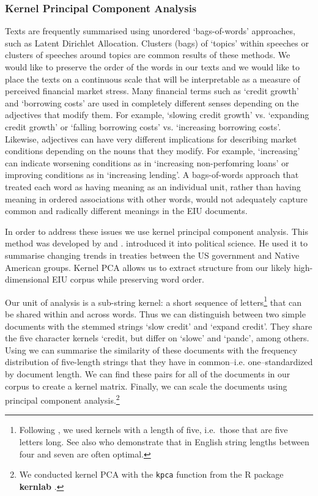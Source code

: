 \documentclass[]{article}
\begin{document}
\subsubsection{Kernel Principal Component
Analysis}\label{kernel-principal-component-analysis}

Texts are frequently summarised using unordered `bags-of-words'
approaches, such as Latent Dirichlet Allocation. Clusters (bags) of `topics' within speeches or clusters of speeches around topics \citep[for a review see][]{Grimmer2013} are common results of these methods. We would like to preserve the order of the words in our texts and we would like to place the texts on a continuous scale that will be interpretable as a measure of perceived financial market stress. Many financial terms such as `credit growth' and `borrowing costs' are used in completely different senses depending on the adjectives that modify them. For example, `slowing credit growth' vs. `expanding credit growth' or `falling borrowing costs' vs. `increasing borrowing costs'. Likewise, adjectives can have very different implications for describing market conditions depending on the nouns that they modify. For example, `increasing' can indicate worsening conditions as in `increasing non-perfomring loans' or improving conditions as in `increasing lending'.  A
bags-of-words approach that treated each word as having meaning as an individual unit, rather than having meaning in ordered associations with other words, would not adequately capture common and radically different meanings in the EIU documents.

In order to address these issues we use kernel principal component analysis. This method was developed by \cite{Scholkopf1998} and \cite{lodhi2002}. \cite{Spirling2012} introduced it into political science. He used it to summarise changing trends in treaties between the US government and Native American groups. Kernel PCA allows us to extract structure from our likely high-dimensional EIU corpus \cite[6531--6537]{Zhang2010} while preserving word order.

Our unit of analysis is a sub-string kernel: a short sequence of letters\footnote{Following \cite{Spirling2012}, we used kernels with a length of five, i.e.~those that are five letters long. See also \cite{lodhi2002} who demonstrate that in English  string lengths between four and seven are often optimal.} that can be shared within and across words. Thus we can distinguish between two simple documents with the stemmed strings `slow credit' and `expand credit'. They share the five character kernels `credit, but differ on `slowc' and `pandc', among others. Using \cite{lodhi2002} we can summarise the similarity of these documents with the frequency distribution of five-length strings that they have in common--i.e. one--standardized by document length. We can find these pairs
for all of the documents in our corpus to create a kernel matrix. Finally, we can scale the documents using principal component analysis.\footnote{We conducted kernel PCA with the \texttt{kpca} function from the R package \textbf{kernlab} \citep{kerblabCite}.}
\end{document}
